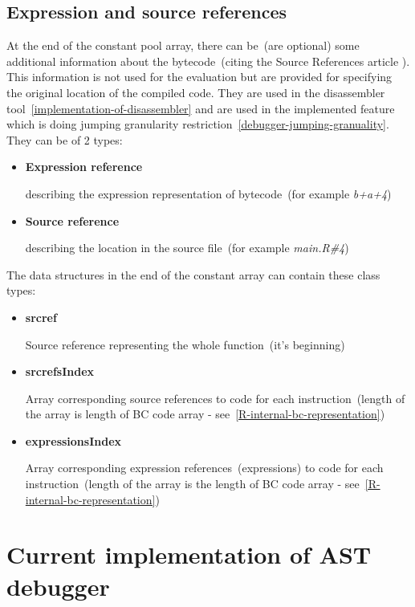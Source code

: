 \documentclass[thesis=M,english]{FITthesis}[2018/10/20]
\begin{document}
\subsection{Expression and source references}\label{Exprref-and-srcref}

At the end of the constant pool array, there can be~(are optional) some additional information about the bytecode~(citing the Source References article \cite{r-srcrefs}). This information is not used for the evaluation but are provided for specifying the original location of the compiled code. They are used in the disassembler tool~\ref{implementation-of-disassembler} and are used in the implemented feature which is doing jumping granularity restriction~\ref{debugger-jumping-granuality}. They can be of 2 types:

\begin{itemize}
	\item \textbf{Expression reference}

describing the expression representation of bytecode~(for example \textit{b+a+4})

	\item \textbf{Source reference}

describing the location in the source file~(for example \textit{main.R{\#}4})
\end{itemize}

The data structures in the end of the constant array can contain these class types:

\begin{itemize}
	\item \textbf{srcref}

Source reference representing the whole function~(it's beginning)

	\item \textbf{srcrefsIndex}

Array corresponding source references to code for each instruction~(length of the array is length of BC code array - see~\ref{R-internal-bc-representation})

	\item \textbf{expressionsIndex}

Array corresponding expression references~(expressions) to code for each instruction~(length of the array is the length of BC code array - see~\ref{R-internal-bc-representation})

\end{itemize}

\section{Current implementation of AST debugger}\label{AST-debugger}
\end{document}
